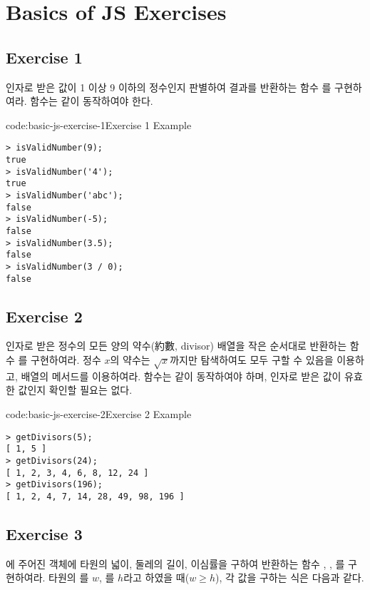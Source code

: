 \section{Basics of JS Exercises} \label{sect:basic-js-exercises}

\subsection*{Exercise 1}
인자로 받은 값이 1 이상 9 이하의 정수인지 판별하여 결과를 반환하는 함수 를 구현하여라.  함수는 \과 같이 동작하여야 한다.

\begin{codeenv}{code:basic-js-exercise-1}{Exercise 1 Example}\begin{verbatim}
> isValidNumber(9);
true
> isValidNumber('4');
true
> isValidNumber('abc');
false
> isValidNumber(-5);
false
> isValidNumber(3.5);
false
> isValidNumber(3 / 0);
false
\end{verbatim}
\end{codeenv}

\subsection*{Exercise 2}
인자로 받은 정수의 모든 양의 약수(約數, divisor) 배열을 작은 순서대로 반환하는 함수 를 구현하여라. 정수 $x$의 약수는 $\sqrt{x}$까지만 탐색하여도 모두 구할 수 있음을 이용하고, 배열의  메서드를 이용하여라.  함수는 \와 같이 동작하여야 하며, 인자로 받은 값이 유효한 값인지 확인할 필요는 없다.

\begin{codeenv}{code:basic-js-exercise-2}{Exercise 2 Example}\begin{verbatim}
> getDivisors(5);
[ 1, 5 ]
> getDivisors(24);
[ 1, 2, 3, 4, 6, 8, 12, 24 ]
> getDivisors(196);
[ 1, 2, 4, 7, 14, 28, 49, 98, 196 ]
\end{verbatim}
\end{codeenv}
\newpage

\subsection*{Exercise 3}
에 주어진  객체에 타원의 넓이, 둘레의 길이, 이심률을 구하여 반환하는 함수 , , 를 구현하여라. 타원의 를 $w$, 를 $h$라고 하였을 때($w \geq h$), 각 값을 구하는 식은 다음과 같다.


